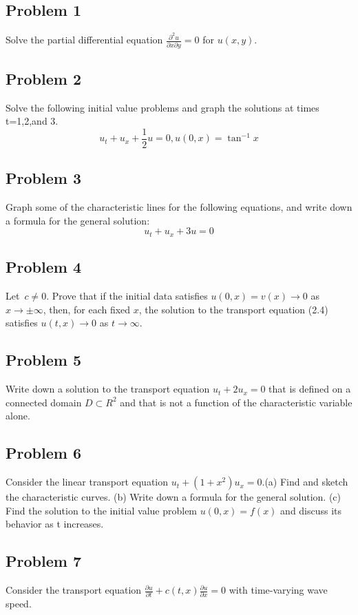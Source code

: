 \documentclass[letterpaper, 11pt]{article}
\newcommand{\1}{\mathds{1}}	%
\theoremstyle{definition}
\begin{document}
\subsection*{Problem 1}
Solve the partial differential equation $\frac{\partial^{2}u}{\partial x \partial y}=0$ for $u(x,y)$.

    \vspace{5cm}

\subsection*{Problem 2}
Solve the following initial value problems and graph the solutions at times t=1,2,and 3.
$$
u_t+u_x+\frac{1}{2}u=0,u(0,x)=\tan^{-1}x
$$ 
  \vspace{10cm}
\subsection*{Problem 3}
Graph some of the characteristic lines for the following equations, and write down a
formula for the general solution:
$$
u_t +u_x +3u=0
$$ 
\vspace{5cm}
\subsection*{Problem 4}
Let~$c\neq0$. Prove that if the initial data satisfies $u(0,x)=v(x)\to0$ as $x\to\pm\infty$, then, for each fixed $x$, the solution to the transport equation (2.4) satisfies $u(t,x)\to0$ as $t\to\infty$.
\vspace{9cm}
\subsection*{Problem 5}
Write down a solution to the transport equation $u_t + 2u_x = 0$ that is defined on a connected domain $D\subset R^2 $ and that is not a function of the characteristic variable alone.
\vspace{5cm}
\subsection*{Problem 6}
Consider the linear transport equation $u_t + (1 + x^2)u_x = 0.$(a) Find and sketch the characteristic curves. (b) Write down a formula for the general solution. (c) Find the solution to the initial value problem $u(0, x) = f (x)$ and discuss its behavior as t increases.


\vspace{10cm}
\subsection*{Problem 7}
Consider the transport equation $\frac{\partial u}{\partial t} + c(t,x) \frac{\partial u}{\partial x} = 0$ with time-varying wave speed.
\end{document}
